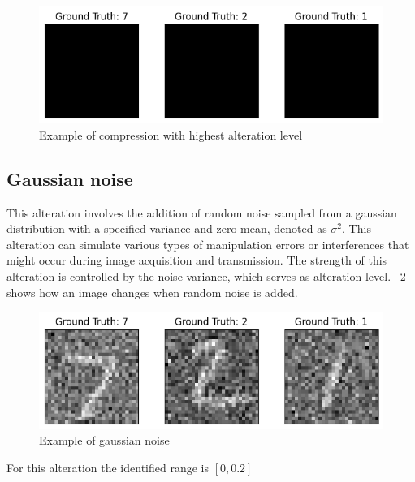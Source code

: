 \begin{figure}[h]
	\centering
	\includegraphics[width=0.6\linewidth]{ImageFiles/Alterations/Compression}
	\caption{Example of compression with highest alteration level}
	\label{fig:Compression}
\end{figure}

\subsection{Gaussian noise}

This alteration involves the addition of random noise sampled from a gaussian distribution with a specified variance and zero mean, denoted as $\sigma^2$. This alteration can simulate various types of manipulation errors or interferences that might occur during image acquisition and transmission. The strength of this alteration is controlled by the noise variance, which serves as alteration level. \Fig~\ref{fig:GN} shows how an image changes when random noise is added.

\begin{figure}[h]
	\centering
	\includegraphics[width=0.6\linewidth]{ImageFiles/Alterations/GN}
	\caption{Example of gaussian noise}
	\label{fig:GN}
\end{figure}

For this alteration the identified range is $[0,0.2]$